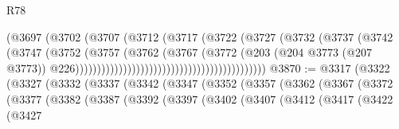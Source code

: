 \begin{lexlean}{R78}
\begin{coremodule}
                                                          (@3697
                                                            (@3702
                                                              (@3707
                                                                (@3712
                                                                  (@3717
                                                                    (@3722
                                                                      (@3727
                                                                        (@3732
                                                                          (@3737
                                                                            (@3742
                                                                              (@3747
                                                                                (@3752
                                                                                  (@3757
                                                                                    (@3762
                                                                                      (@3767
                                                                                        (@3772
                                                                                          (@203
                                                                                            (@204
                                                                                              @3773
                                                                                              (@207
                                                                                                @3773))
                                                                                            @226))))))))))))))))))))))))))))))))))))))))))))
@3870 := @3317
    (@3322
      (@3327
        (@3332
          (@3337
            (@3342
              (@3347
                (@3352
                  (@3357
                    (@3362
                      (@3367
                        (@3372
                          (@3377
                            (@3382
                              (@3387
                                (@3392
                                  (@3397
                                    (@3402
                                      (@3407
                                        (@3412
                                          (@3417
                                            (@3422
                                              (@3427

\end{coremodule}
\end{lexlean}
